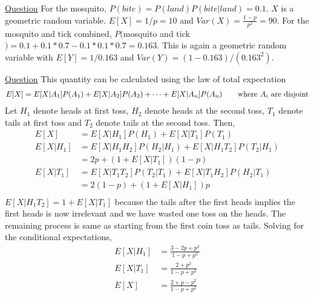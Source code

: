 \documentclass[../probability-notes.tex]{subfiles}
\begin{document}
\begin{enumerate}
        
        \hypertarget{a_mosquito}{\item} \hyperlink{q_mosquito}{Question}\newline
        For the mosquito, $P(bite) =  P(land)P(bite|land) = 0.1$. $X$ is a geometric random variable. $E[X] = 1/p = 10$ and $Var(X) = \frac{1-p}{p^{2}} = 90$.\newline
        For the mosquito and tick combined, $P($mosquito and tick$) = 0.1 + 0.1*0.7 - 0.1*0.1*0.7 = 0.163$. This is again a geometric random variable with $E[Y] = 1/0.163$ and $Var(Y) = (1-0.163)/(0.163^{2})$.


        \hypertarget{a_hhtt}{\item} \hyperlink{q_hhtt}{Question}\newline
        This quantity can be calculated using the law of total expectation
        \begin{align*}
            E[X] = E[X|A_{1}]P(A_{1}) + E[X|A_{2}]P(A_{2}) + \cdots + E[X|A_{n}]P(A_{n}) \tag*{where $A_{i}$ are disjoint}
        \end{align*}
        Let $H_{1}$ denote heads at first toss, $H_{2}$ denote heads at the second toss, $T_{1}$ denote tails at first toss and $T_{2}$ denote tails at the second toss. Then,
        \begin{align*}
            E[X] &= E[X|H_{1}]P(H_{1}) + E[X|T_{1}]P(T_{1})\\
            E[X|H_{1}] &= E[X|H_{1}H_{2}]P(H_{2}|H_{1}) + E[X|H_{1}T_{2}]P(T_{2}|H_{1})\\
                    &= 2p + (1 + E[X|T_{1}])(1-p)\\
            E[X|T_{1}] &= E[X|T_{1}T_{2}]P(T_{2}|T_{1}) + E[X|T_{1}H_{2}]P(H_{2}|T_{1})\\
                    &= 2(1-p) + (1 + E[X|H_{1}])p\\
        \end{align*}
        $E[X|H_{1}T_{2}] = 1 + E[X|T_{1}]$ because the tails after the first heads implies the first heads is now irrelevant and we have wasted one toss on the heads. The remaining process is same as starting from the first coin toss as tails. \newline
        Solving for the conditional expectations,
        \begin{align*}
            E[X|H_{1}] &= \frac{3 - 2p + p^{2}}{1 - p + p^{2}}\\
            E[X|T_{1}] &= \frac{2 + p^{2}}{1 - p + p^{2}}\\
            E[X] &= \frac{2 + p - p^{2}}{1 - p + p^{2}}
        \end{align*}


\end{enumerate}
\end{document}
